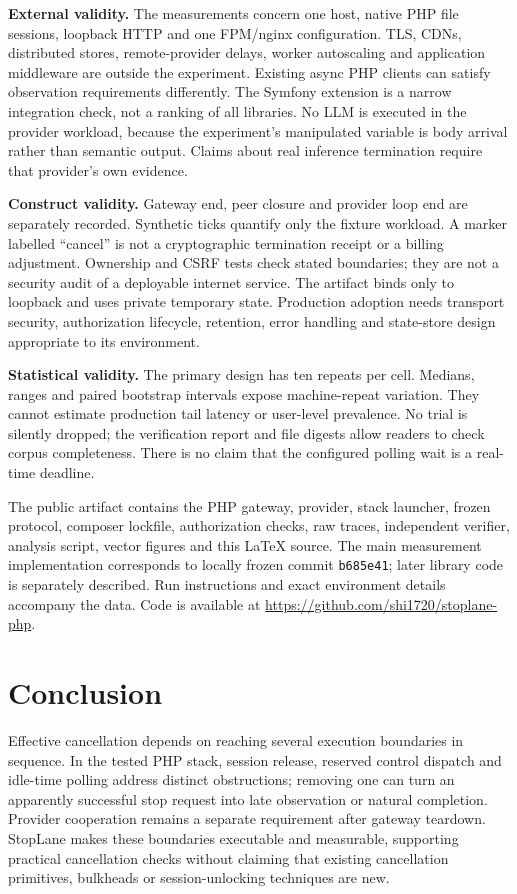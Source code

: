 \documentclass[11pt,a4paper]{article}
\begin{document}
\textbf{External validity.} The measurements concern one host, native PHP file sessions, loopback HTTP and one FPM/nginx configuration. TLS, CDNs, distributed stores, remote-provider delays, worker autoscaling and application middleware are outside the experiment. Existing async PHP clients can satisfy observation requirements differently. The Symfony extension is a narrow integration check, not a ranking of all libraries. No LLM is executed in the provider workload, because the experiment's manipulated variable is body arrival rather than semantic output. Claims about real inference termination require that provider's own evidence.

\textbf{Construct validity.} Gateway end, peer closure and provider loop end are separately recorded. Synthetic ticks quantify only the fixture workload. A marker labelled ``cancel'' is not a cryptographic termination receipt or a billing adjustment. Ownership and CSRF tests check stated boundaries; they are not a security audit of a deployable internet service. The artifact binds only to loopback and uses private temporary state. Production adoption needs transport security, authorization lifecycle, retention, error handling and state-store design appropriate to its environment.

\textbf{Statistical validity.} The primary design has ten repeats per cell. Medians, ranges and paired bootstrap intervals expose machine-repeat variation. They cannot estimate production tail latency or user-level prevalence. No trial is silently dropped; the verification report and file digests allow readers to check corpus completeness. There is no claim that the configured polling wait is a real-time deadline.

The public artifact contains the PHP gateway, provider, stack launcher, frozen protocol, composer lockfile, authorization checks, raw traces, independent verifier, analysis script, vector figures and this LaTeX source. The main measurement implementation corresponds to locally frozen commit \texttt{b685e41}; later library code is separately described. Run instructions and exact environment details accompany the data. Code is available at \url{https://github.com/shi1720/stoplane-php}.

\section{Conclusion}
Effective cancellation depends on reaching several execution boundaries in sequence. In the tested PHP stack, session release, reserved control dispatch and idle-time polling address distinct obstructions; removing one can turn an apparently successful stop request into late observation or natural completion. Provider cooperation remains a separate requirement after gateway teardown. StopLane makes these boundaries executable and measurable, supporting practical cancellation checks without claiming that existing cancellation primitives, bulkheads or session-unlocking techniques are new.
\end{document}
